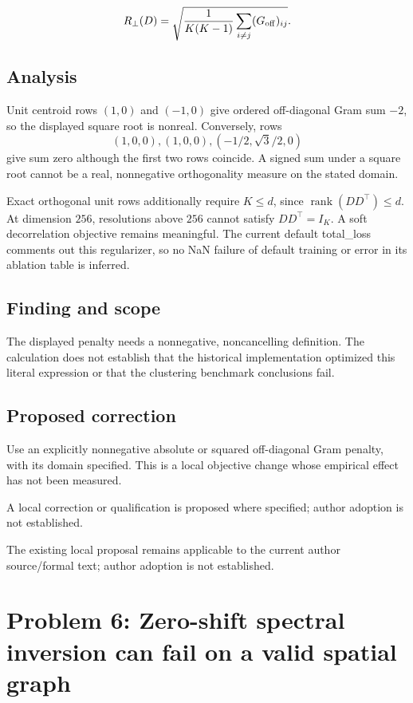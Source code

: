 \documentclass[11pt]{article}
\begin{document}
\[R_\perp(D)=\sqrt{\frac1{K(K-1)}\sum_{i\ne j}(G_{\rm off})_{ij}}. \]

\subsection*{Analysis}

Unit centroid rows \((1,0)\) and \((-1,0)\) give ordered off-diagonal Gram sum \(-2\), so the displayed square root is nonreal. Conversely, rows \[(1,0,0),(1,0,0),(-1/2,\sqrt3/2,0)\] give sum zero although the first two rows coincide. A signed sum under a square root cannot be a real, nonnegative orthogonality measure on the stated domain.

Exact orthogonal unit rows additionally require \(K\le d\), since \(\operatorname{rank}(DD^\top)\le d\). At dimension \(256\), resolutions above \(256\) cannot satisfy \(DD^\top=I_K\). A soft decorrelation objective remains meaningful. The current default total\_loss comments out this regularizer, so no NaN failure of default training or error in its ablation table is inferred.

\subsection*{Finding and scope}

The displayed penalty needs a nonnegative, noncancelling definition. The calculation does not establish that the historical implementation optimized this literal expression or that the clustering benchmark conclusions fail.

\subsection*{Proposed correction}

Use an explicitly nonnegative absolute or squared off-diagonal Gram penalty, with its domain specified. This is a local objective change whose empirical effect has not been measured.

A local correction or qualification is proposed where specified; author adoption is not established.

The existing local proposal remains applicable to the current author source/formal text; author adoption is not established.

\section*{Problem 6: Zero-shift spectral inversion can fail on a valid spatial graph}
\end{document}

